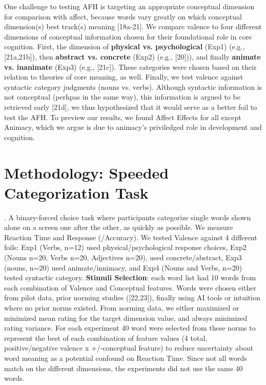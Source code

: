 One challenge to testing AFH is targeting an appropriate conceptual dimension for comparison with affect, because words vary greatly on which conceptual dimension(s) best track(s) meaning [18a-21]. We compare valence to four different dimensions of conceptual information chosen for their foundational role in core cognition. First, the dimension of \textbf{physical vs. psychological} (Exp1) (e.g., [21a,21b]), 
then \textbf{abstract vs. concrete} (Exp2) (e.g., [20])), and finally \textbf{animate vs. inanimate} (Exp3) (e.g., [21c]). These categories were chosen based on their relation to theories of core meaning, as well. Finally, we test valence against syntactic category judgments (nouns vs. verbs). Although syntactic information is not conceptual (perhpas in the same way), this information is argued to be retrieved early [21d], we thus hypothesized that it would serve as a better foil to test the AFH. To preview our results, we found Affect Effects for all except Animacy, which we argue is due to animacy's priviledged role in development and cognition.


\section{Methodology: Speeded Categorization Task}. A binary-forced choice task where participants categorize single words shown alone on a screen one after the other, as quickly as possible. We measure Reaction Time and Response (/Accuracy). We tested Valence against 4 different foils: Exp1 (Verbs, n=12) used physical/psychological response choices, Exp2 (Nouns n=20, Verbs n=20, Adjectives n=20), used concrete/abstract, Exp3 (nouns, n=20) used animate/innimacy, and Exp4 (Nouns and Verbs, n=20) tested syntactic category. \textbf{Stimuli Selection}: each word list had 10 words from each combination of Valence and Conceptual features. Words were chosen either from pilot data, prior norming studies ([22,23]), finally using AI tools or intuition where no prior norms existed. From norming data, we either maximized or minimized mean rating for the target dimension value, and always minimized rating variance. For each experiment 40 word were selected from these norms to represent the best of each combination of feature values (4 total, positive/negative valence x +/-conceptual feature) to reduce uncertainty about word meaning as a potential confound on Reaction Time. Since not all words match on the different dimensions, the experiments did not use the same 40 words.


